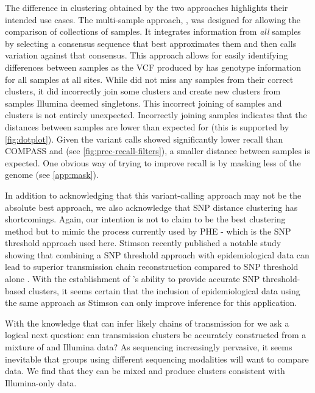The difference in clustering obtained by the two \pandora{} approaches highlights their intended use cases. The multi-sample approach, \compare{}, was designed for allowing the comparison of collections of samples. It integrates information from \emph{all} samples by selecting a consensus sequence that best approximates them and then calls variation against that consensus. This approach allows for easily identifying differences between samples as the VCF produced by \compare{} has genotype information for all samples at all sites. While \compare{} did not miss any samples from their correct clusters, it did incorrectly join some clusters and create new clusters from samples Illumina deemed singletons. This incorrect joining of samples and clusters is not entirely unexpected. Incorrectly joining samples indicates that the distances between samples are lower than expected for \compare{} (this is supported by \autoref{fig:dotplot}). Given the \pandora{} variant calls showed significantly lower recall than COMPASS and \bcftools{} (see \autoref{fig:prec-recall-filters}), a smaller distance between samples is expected. One obvious way of trying to improve recall is by masking less of the genome (see \autoref{app:mask}). 

In addition to acknowledging that this variant-calling approach may not be the absolute best approach, we also acknowledge that SNP distance clustering has shortcomings. Again, our intention is not to claim to be the best clustering method but to mimic the process currently used by PHE - which is the SNP threshold approach used here. Stimson \etal{} recently published a notable study showing that combining a SNP threshold approach with epidemiological data can lead to superior transmission chain reconstruction compared to SNP threshold alone \cite{stimson2019}. With the establishment of \ont{}'s ability to provide accurate SNP threshold-based clusters, it seems certain that the inclusion of epidemiological data using the same approach as Stimson \etal{} can only improve inference for this application.

With the knowledge that \ont{} can infer likely chains of transmission for \mtb{} we ask a logical next question: can transmission clusters be accurately constructed from a mixture of \ont{} and Illumina data? As \ont{} sequencing increasingly pervasive, it seems inevitable that groups using different sequencing modalities will want to compare data. We find that they can be mixed and produce clusters consistent with Illumina-only data. 

